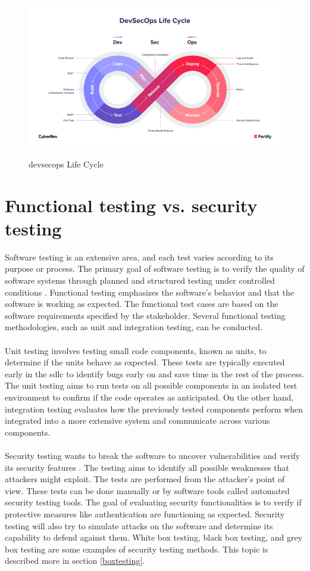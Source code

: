 \begin{figure}[H]
    \centering
    \includegraphics[width=0.8\columnwidth]{Images/devsec.png}
    \caption{\acrshort{devsecops} Life Cycle}
    \label{fig: DevSecOps Life Cycle}\cite{devsecopsbilde}
\end{figure}

\newpage
\section{Functional testing vs. security testing}
\label{Functional Testing vs Security Testing}
Software testing is an extensive area, and each test varies according to its purpose or process. The primary goal of software testing is to verify the quality of software systems through planned and structured testing under controlled conditions \cite{difftesting}. Functional testing emphasizes the software's behavior and that the software is working as expected. The functional test cases are based on the software requirements specified by the stakeholder. Several functional testing methodologies, such as unit and integration testing, can be conducted. 
\\~\\
Unit testing involves testing small code components, known as units, to determine if the units behave as expected\cite{unitvsintergration}. These tests are typically executed early in the \acrshort{sdlc} to identify bugs early on and save time in the rest of the process. The unit testing aims to run tests on all possible components in an isolated test environment to confirm if the code operates as anticipated. On the other hand, integration testing evaluates how the previously tested components perform when integrated into a more extensive system and communicate across various components.
\\~\\
Security testing wants to break the software to uncover vulnerabilities and verify its security features \cite{whysectest}. The testing aims to identify all possible weaknesses that attackers might exploit. The tests are performed from the attacker's point of view. These tests can be done manually or by software tools called automated security testing tools. The goal of evaluating security functionalities is to verify if protective measures like authentication are functioning as expected. Security testing will also try to simulate attacks on the software and determine its capability to defend against them. White box testing, black box testing, and grey box testing are some examples of security testing methods. This topic is described more in section \ref{boxtesting}. 
\newpage
